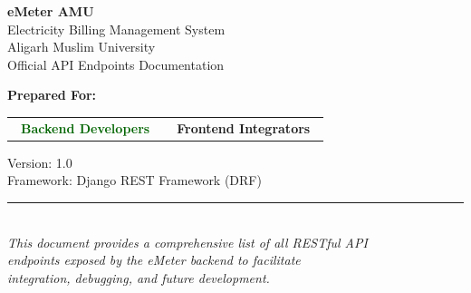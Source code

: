 \documentclass[12pt, a4paper]{report}
\begin{document}
\begin{titlepage}
    \centering
    \vspace*{2cm}
    
    \begin{tcolorbox}[
        colback=deepBlue, colframe=primaryGreen,
        width=\textwidth, arc=8pt, boxrule=2pt
    ]
        \centering
        \vspace{0.5cm}
        {\Huge\bfseries\color{primaryGreen} eMeter AMU}\\[0.4cm]
        {\Large\color{white} Electricity Billing Management System}\\[0.3cm]
        {\large\color{lightGreen} Aligarh Muslim University}\\[0.2cm]
        {\normalsize\color{borderColor} Official API Endpoints Documentation}
        \vspace{0.5cm}
    \end{tcolorbox}
    
    \vspace{1.5cm}
    
    {\large\bfseries\color{textMid} Prepared For:}\\[0.4cm]
    \begin{tabular}{c c}
        \colorbox{primaryGreen!15}{\textcolor{darkGreen}{\textbf{\ Backend Developers\ }}}
        &
        \colorbox{deepBlue!10}{\textcolor{deepBlue}{\textbf{\ Frontend Integrators\ }}}
    \end{tabular}
    
    \vfill
    
    {\small\color{textMid}
        Version: 1.0\\
        Framework: Django REST Framework (DRF)\\[0.3cm]
        \textcolor{borderColor}{\rule{6cm}{0.4pt}}\\[0.3cm]
        \textit{This document provides a comprehensive list of all RESTful API\\
        endpoints exposed by the eMeter backend to facilitate\\
        integration, debugging, and future development.}
    }
\end{titlepage}

\tableofcontents

\newpage

\end{document}
